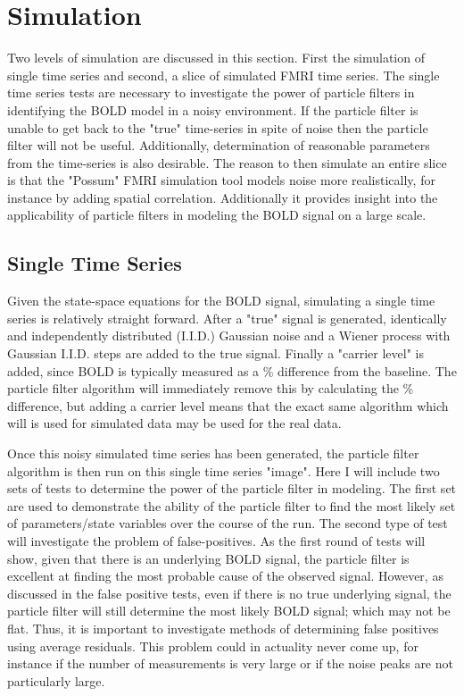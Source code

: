 \chapter{Simulation}
Two levels of simulation are discussed in this section. First the simulation of single time series
and second, a slice of simulated FMRI time series. The single time series tests
are necessary to investigate the power of particle filters in 
identifying the BOLD model in a noisy environment. If the particle filter is unable
to get back to the "true" time-series in spite of noise then the particle filter
will not be useful. Additionally, determination of reasonable parameters from the
time-series is also desirable. The reason to then simulate an entire slice is that
the "Possum" FMRI simulation tool models noise more realistically, for instance by
adding spatial correlation. Additionally 
it provides insight into the applicability of particle filters in modeling the BOLD 
signal on a large scale.

\section{Single Time Series}
Given the state-space equations for the BOLD signal, simulating a single time 
series is relatively straight forward. After a "true" signal is generated,
identically and independently distributed (I.I.D.) Gaussian noise and a Wiener
process with Gaussian I.I.D. steps are added to the true signal. Finally a 
"carrier level" is added, since BOLD is typically
measured as a \% difference from the baseline. The particle filter
algorithm will immediately remove this by calculating the \% difference, 
but adding a carrier level means that the exact same algorithm which 
will is used for simulated data may be used for the real data. 

Once this noisy simulated time series has been generated, the particle filter algorithm
 is then run on this single time series "image". Here I will include two sets of tests 
to determine the power of the particle filter in modeling. The first set are 
used to demonstrate the ability of the particle filter to find the most likely
set of parameters/state variables over the course of the run. The second type
of test will investigate the problem of false-positives. As the first
round of tests will show, given that there is an underlying BOLD signal, 
the particle filter is excellent at finding the most probable cause of 
the observed signal. However, as discussed in the false positive tests,
even if there is no true underlying signal, the particle filter will still determine
the most likely BOLD signal; which may not be flat. Thus, it is 
important to investigate methods of determining false positives using 
average residuals. This problem could in actuality never come up, for instance
if the number of measurements is very large or if the noise peaks are not
particularly large.

